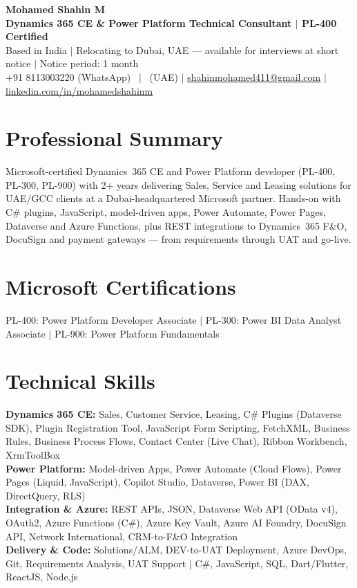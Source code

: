 \documentclass[10pt,a4paper]{article}
\def\DubaiContact{}
\begin{document}
\begin{center}
  {\LARGE\bfseries Mohamed Shahin M}\\[3pt]
  {\normalsize\bfseries Dynamics 365 CE \& Power Platform Technical Consultant $\mid$ PL-400 Certified}\\[3pt]
  Based in India $\mid$ Relocating to Dubai, UAE --- available for interviews at short notice $\mid$ Notice period: 1 month\\[2pt]
  +91 8113003220 (WhatsApp)%
  \ifx\DubaiContact\empty\else\ $\mid$ \DubaiContact\ (UAE)\fi
  $\mid$ \href{mailto:shahinmohamed411@gmail.com}{shahinmohamed411@gmail.com}
  $\mid$ \href{https://www.linkedin.com/in/mohamedshahinm}{linkedin.com/in/mohamedshahinm}
\end{center}
\vspace{-6pt}

\section*{Professional Summary}
Microsoft-certified Dynamics~365 CE and Power Platform developer (PL-400, PL-300, PL-900) with 2+ years delivering Sales, Service and Leasing solutions for UAE/GCC clients at a Dubai-headquartered Microsoft partner. Hands-on with C\# plugins, JavaScript, model-driven apps, Power Automate, Power Pages, Dataverse and Azure Functions, plus REST integrations to Dynamics~365 F\&O, DocuSign and payment gateways --- from requirements through UAT and go-live.

\section*{Microsoft Certifications}
{\small PL-400: Power Platform Developer Associate $\mid$ PL-300: Power BI Data Analyst Associate $\mid$ PL-900: Power Platform Fundamentals\par}

\section*{Technical Skills}
\textbf{Dynamics 365 CE:} Sales, Customer Service, Leasing, C\# Plugins (Dataverse SDK), Plugin Registration Tool, JavaScript Form Scripting, FetchXML, Business Rules, Business Process Flows, Contact Center (Live Chat), Ribbon Workbench, XrmToolBox\\[2pt]
\textbf{Power Platform:} Model-driven Apps, Power Automate (Cloud Flows), Power Pages (Liquid, JavaScript), Copilot Studio, Dataverse, Power BI (DAX, DirectQuery, RLS)\\[2pt]
\textbf{Integration \& Azure:} REST APIs, JSON, Dataverse Web API (OData v4), OAuth2, Azure Functions (C\#), Azure Key Vault, Azure AI Foundry, DocuSign API, Network International, CRM-to-F\&O Integration\\[2pt]
\textbf{Delivery \& Code:} Solutions/ALM, DEV-to-UAT Deployment, Azure DevOps, Git, Requirements Analysis, UAT Support $\mid$ C\#, JavaScript, SQL, Dart/Flutter, ReactJS, Node.js
\end{document}
